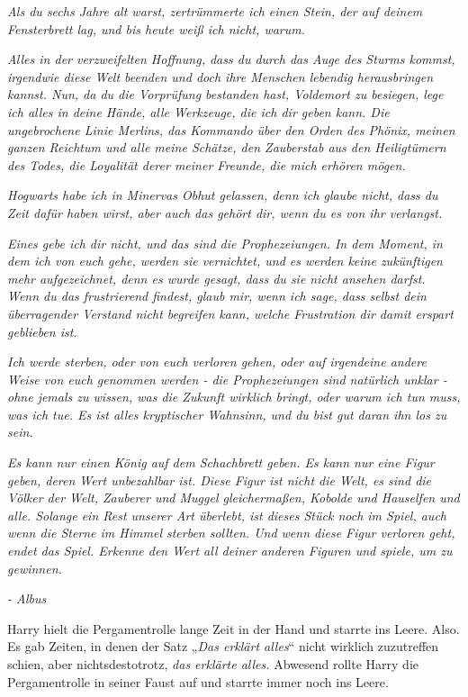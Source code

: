 {\emph{Als du sechs Jahre alt warst, zertrümmerte ich einen Stein, der auf deinem Fensterbrett lag, und bis heute weiß ich nicht, warum.}

\emph{\hfill\break Alles in der verzweifelten Hoffnung, dass du durch das Auge des Sturms kommst, irgendwie diese Welt beenden und doch ihre Menschen lebendig herausbringen kannst. Nun, da du die Vorprüfung bestanden hast, Voldemort zu besiegen, lege ich alles in deine Hände, alle Werkzeuge, die ich dir geben kann. Die ungebrochene Linie Merlins, das Kommando über den Orden des Phönix, meinen ganzen Reichtum und alle meine Schätze, den Zauberstab aus den Heiligtümern des Todes, die Loyalität derer meiner Freunde, die mich erhören mögen.}

\emph{\hfill\break Hogwarts habe ich in Minervas Obhut gelassen, denn ich glaube nicht, dass du Zeit dafür haben wirst, aber auch das gehört dir, wenn du es von ihr verlangst.}

\emph{\hfill\break Eines gebe ich dir nicht, und das sind die Prophezeiungen. In dem Moment, in dem ich von euch gehe, werden sie vernichtet, und es werden keine zukünftigen mehr aufgezeichnet, denn es wurde gesagt, dass du sie nicht ansehen darfst. Wenn du das frustrierend findest, glaub mir, wenn ich sage, dass selbst dein überragender Verstand nicht begreifen kann, welche Frustration dir damit erspart geblieben ist.}

\emph{\hfill\break Ich werde sterben, oder von euch verloren gehen, oder auf irgendeine andere Weise von euch genommen werden - die Prophezeiungen sind natürlich unklar - ohne jemals zu wissen, was die Zukunft wirklich bringt, oder warum ich tun muss, was ich tue. Es ist alles kryptischer Wahnsinn, und du bist gut daran ihn los zu sein.}

\emph{Es kann nur einen König auf dem Schachbrett geben. Es kann nur eine Figur geben, deren Wert unbezahlbar ist. Diese Figur ist nicht die Welt, es sind die Völker der Welt, Zauberer und Muggel gleichermaßen, Kobolde und Hauselfen und alle. Solange ein Rest unserer Art überlebt, ist dieses Stück noch im Spiel, auch wenn die Sterne im Himmel sterben sollten. Und wenn diese Figur verloren geht, endet das Spiel. Erkenne den Wert all deiner anderen Figuren und spiele, um zu gewinnen.}

\emph{\hfill\break - Albus}

Harry hielt die Pergamentrolle lange Zeit in der Hand und starrte ins Leere. Also. Es gab Zeiten, in denen der Satz „\emph{Das erklärt alles}“ nicht wirklich zuzutreffen schien, aber nichtsdestotrotz, \emph{das erklärte alles.} Abwesend rollte Harry die Pergamentrolle in seiner Faust auf und starrte immer noch ins Leere.

}
